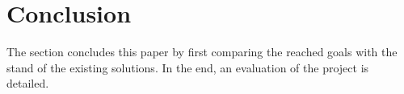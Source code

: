 \section{Conclusion}
The section concludes this paper by first comparing the reached goals with the stand of the existing solutions. In the end, an evaluation of the project is detailed. 


